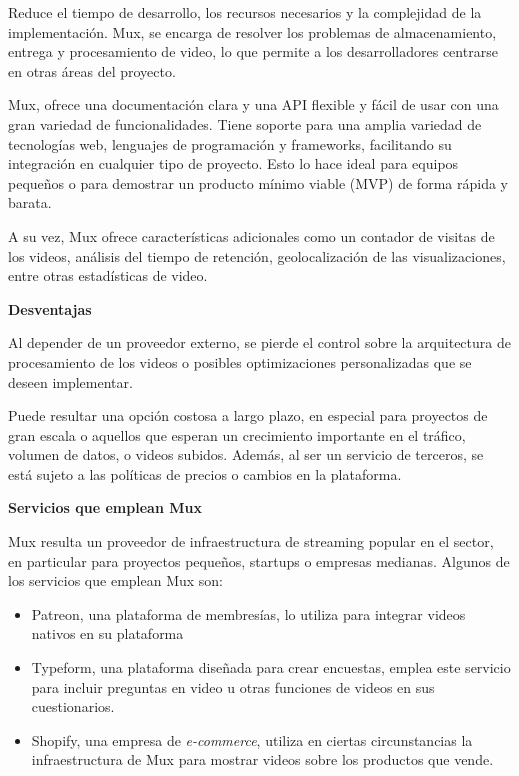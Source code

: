 Reduce el tiempo de desarrollo, los recursos necesarios y la complejidad de la implementación. Mux, se encarga de resolver los problemas de almacenamiento, entrega y procesamiento de video, lo que permite a los desarrolladores centrarse en otras áreas del proyecto.

Mux, ofrece una documentación clara y una API flexible y fácil de usar con una gran variedad de funcionalidades. Tiene soporte para una amplia variedad de tecnologías web, lenguajes de programación y frameworks, facilitando su integración en cualquier tipo de proyecto. Esto lo hace ideal para equipos pequeños o para demostrar un producto mínimo viable (MVP) de forma rápida y barata. 

A su vez, Mux ofrece características adicionales como un contador de visitas de los videos, análisis del tiempo de retención, geolocalización de las visualizaciones, entre otras estadísticas de video. 

\textbf{Desventajas}

Al depender de un proveedor externo, se pierde el control sobre la arquitectura de procesamiento de los videos o posibles optimizaciones personalizadas que se deseen implementar. 

Puede resultar una opción costosa a largo plazo, en especial para proyectos de gran escala o aquellos que esperan un crecimiento importante en el tráfico, volumen de datos, o videos subidos. Además, al ser un servicio de terceros, se está sujeto a las políticas de precios o cambios en la plataforma. 


\textbf{Servicios que emplean Mux}

Mux resulta un proveedor de infraestructura de streaming popular en el sector, en particular para proyectos pequeños, startups o empresas medianas. Algunos de los servicios que emplean Mux son: 

\begin{itemize}
    \item Patreon, una plataforma de membresías, lo utiliza para integrar videos nativos en su plataforma
    \item Typeform, una plataforma diseñada para crear encuestas, emplea este servicio para incluir preguntas en video u otras funciones de videos en sus cuestionarios.
    \item Shopify, una empresa de \textit{e-commerce}, utiliza en ciertas circunstancias la infraestructura de Mux para mostrar videos sobre los productos que vende.   
\end{itemize}


